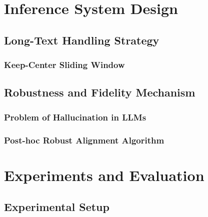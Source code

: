 \chapter{Inference System Design}

\section{Long-Text Handling Strategy}
\subsection{Keep-Center Sliding Window}

\section{Robustness and Fidelity Mechanism} 
\subsection{Problem of Hallucination in LLMs}
\subsection{Post-hoc Robust Alignment Algorithm}

\chapter{Experiments and Evaluation}

\section{Experimental Setup}
